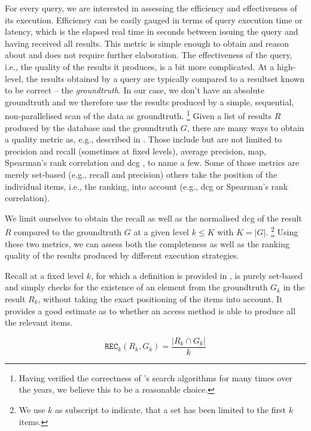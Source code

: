 For every query, we are interested in assessing the efficiency and effectiveness of its execution. Efficiency can be easily gauged in terms of query execution time or latency, which is the elapsed real time in seconds between issuing the query and having received all results. This metric is simple enough to obtain and reason about and does not require further elaboration. The effectiveness of the query, i.e., the quality of the results it produces, is a bit more complicated. At a high-level, the results obtained by a query are typically compared to a resultset known to be correct -- the \emph{groundtruth}. In our case, we don't have an absolute groundtruth and we therefore use the results produced by a simple, sequential, non-parallelised scan of the data as groundtruth. \footnote{Having verified the correctness of \cottontail{}'s search algorithms for many times over the years, we believe this to be a reasonable choice.} Given a list of results $R$ produced by the database and the groundtruth $G$, there are many ways to obtain a quality metric as, e.g., described in \cite{Webber:2010Similarity}. Those include but are not limited to precision and recall (sometimes at fixed levels), average precision, \acrfull{map}, Spearman's rank correlation and \acrfull{dcg} \cite{Jarvelin:2002Cumulated}, to name a few. Some of those metrics are merely set-based (e.g., recall and precision) others take the position of the individual items, i.e., the ranking, into account (e.g., \acrshort{dcg} or Spearman's rank correlation).

We limit ourselves to obtain the recall as well as the normalised \acrshort{dcg} \cite{Jarvelin:2002Cumulated} of the result $R$ compared to the groundtruth $G$ at a given level $k \leq K$ with $K = |G|$. \footnote{We use $k$ as subscript to indicate, that a set has been limited to the first $k$ items.} Using these two metrics, we can assess both the completeness as well as the ranking quality of the results produced by different execution strategies.

Recall at a fixed level $k$, for which a definition is provided in , is purely set-based and simply checks for the existence of an element from the groundtruth $G_k$ in the result $R_k$, without taking the exact positioning of the items into account. It provides a good estimate as to whether an access method is able to produce all the relevant items.

\begin{equation}
    \label{equation:recall}
    \texttt{REC}_k (R_k, G_k) = \frac{|R_k \cap G_k |}{k}
\end{equation}

